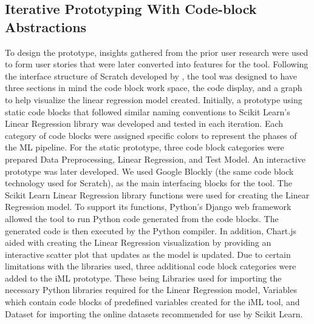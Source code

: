 \documentclass{sigchi-ext}
\begin{document}
\subsection{Iterative Prototyping With Code-block Abstractions}
To design the prototype, insights gathered from the prior user research were used to form user stories that were later converted into features for the tool. Following the interface structure of Scratch developed by \cite{mit:Scratch}, the tool was designed to have three sections in mind \textemdash the code block work space, the code display, and a graph to help visualize the linear regression model created. Initially, a prototype using static code blocks that followed similar naming conventions to Scikit Learn's Linear Regression library was developed and tested in each iteration. Each category of code blocks were assigned specific colors to represent the phases of the ML pipeline. For the static prototype, three code block categories were prepared \textemdash Data Preprocessing, Linear Regression, and Test Model. An interactive prototype was later developed. We used Google Blockly (the same code block technology used for Scratch), as the main interfacing blocks for the tool. The Scikit Learn Linear Regression library functions were used for creating the Linear Regression model. To support its functions, Python's Django web framework allowed the tool to run Python code generated from the code blocks. The generated code is then executed by the Python compiler. In addition, Chart.js aided with creating the Linear Regression visualization by providing an interactive scatter plot that updates as the model is updated. Due to certain limitations with the libraries used, three additional code block categories were added to the iML prototype. These being Libraries used for importing the necessary Python libraries required for the Linear Regression model, Variables which contain code blocks of predefined variables created for the iML tool, and Dataset for importing the online datasets recommended for use by Scikit Learn. 
\end{document}
